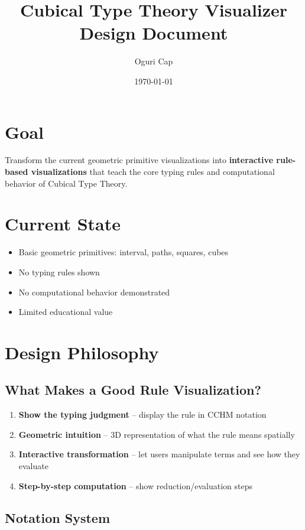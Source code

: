 \documentclass[11pt,a4paper]{article}
\title{Cubical Type Theory Visualizer\\Design Document}
\author{Oguri Cap}
\date{\today}
\begin{document}
\maketitle

\section{Goal}

Transform the current geometric primitive visualizations into \textbf{interactive rule-based visualizations} that teach the core typing rules and computational behavior of Cubical Type Theory.

\section{Current State}

\begin{itemize}
\item[\checkmark] Basic geometric primitives: interval, paths, squares, cubes
\item[$\times$] No typing rules shown
\item[$\times$] No computational behavior demonstrated
\item[$\times$] Limited educational value
\end{itemize}

\section{Design Philosophy}

\subsection{What Makes a Good Rule Visualization?}

\begin{enumerate}
\item \textbf{Show the typing judgment} -- display the rule in CCHM notation
\item \textbf{Geometric intuition} -- 3D representation of what the rule means spatially
\item \textbf{Interactive transformation} -- let users manipulate terms and see how they evaluate
\item \textbf{Step-by-step computation} -- show reduction/evaluation steps
\end{enumerate}

\subsection{Notation System}
\end{document}
